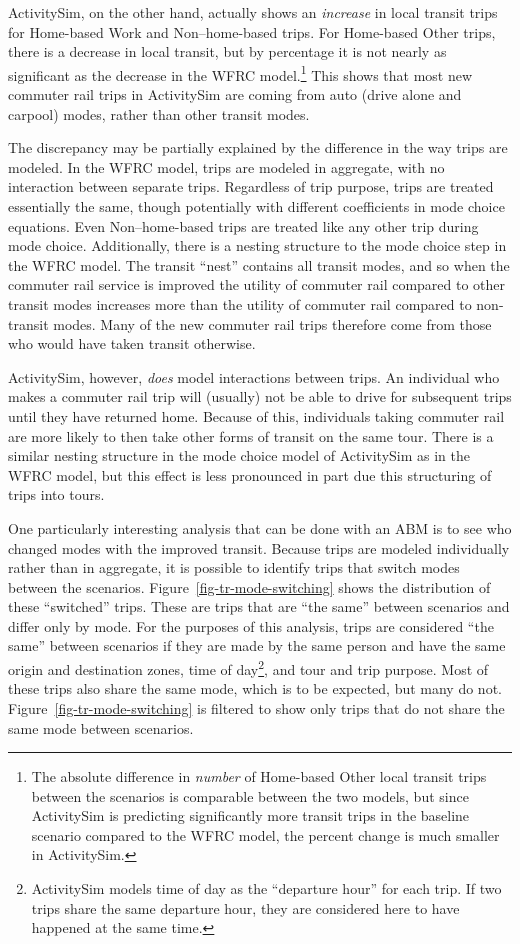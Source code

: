 \documentclass[fancy, oneside, mastersfancy, ms]{byuthesis}
\begin{document}
ActivitySim, on the other hand, actually shows an \emph{increase} in
local transit trips for Home-based Work and Non--home-based trips. For
Home-based Other trips, there is a decrease in local transit, but by
percentage it is not nearly as significant as the decrease in the WFRC
model.\footnote{The absolute difference in \emph{number} of Home-based
  Other local transit trips between the scenarios is comparable between
  the two models, but since ActivitySim is predicting significantly more
  transit trips in the baseline scenario compared to the WFRC model, the
  percent change is much smaller in ActivitySim.} This shows that most
new commuter rail trips in ActivitySim are coming from auto (drive alone
and carpool) modes, rather than other transit modes.

The discrepancy may be partially explained by the difference in the way
trips are modeled. In the WFRC model, trips are modeled in aggregate,
with no interaction between separate trips. Regardless of trip purpose,
trips are treated essentially the same, though potentially with
different coefficients in mode choice equations. Even Non--home-based
trips are treated like any other trip during mode choice. Additionally,
there is a nesting structure to the mode choice step in the WFRC model.
The transit ``nest'' contains all transit modes, and so when the
commuter rail service is improved the utility of commuter rail compared
to other transit modes increases more than the utility of commuter rail
compared to non-transit modes. Many of the new commuter rail trips
therefore come from those who would have taken transit otherwise.

ActivitySim, however, \emph{does} model interactions between trips. An
individual who makes a commuter rail trip will (usually) not be able to
drive for subsequent trips until they have returned home. Because of
this, individuals taking commuter rail are more likely to then take
other forms of transit on the same tour. There is a similar nesting
structure in the mode choice model of ActivitySim as in the WFRC model,
but this effect is less pronounced in part due this structuring of trips
into tours.

One particularly interesting analysis that can be done with an ABM is to
see who changed modes with the improved transit. Because trips are
modeled individually rather than in aggregate, it is possible to
identify trips that switch modes between the scenarios.
Figure~\ref{fig-tr-mode-switching} shows the distribution of these
``switched'' trips. These are trips that are ``the same'' between
scenarios and differ only by mode. For the purposes of this analysis,
trips are considered ``the same'' between scenarios if they are made by
the same person and have the same origin and destination zones, time of
day\footnote{ActivitySim models time of day as the ``departure hour''
  for each trip. If two trips share the same departure hour, they are
  considered here to have happened at the same time.}, and tour and trip
purpose. Most of these trips also share the same mode, which is to be
expected, but many do not. Figure~\ref{fig-tr-mode-switching} is
filtered to show only trips that do not share the same mode between
scenarios.
\end{document}

